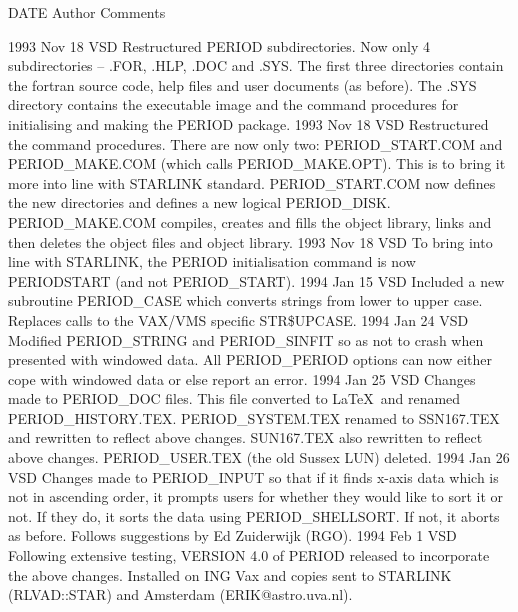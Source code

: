 \documentclass[twoside,11pt,noabs,nolof]{starlink}
\begin{document}
\newpage

\begin{small}
\begin{terminalv}
   DATE       Author            Comments


1993 Nov 18    VSD       Restructured PERIOD subdirectories. Now only 4
                         subdirectories -- .FOR, .HLP, .DOC and .SYS. The
                         first three directories contain the fortran source
                         code, help files and user documents (as before). The
                         .SYS directory contains the executable image and the
                         command procedures for initialising and making the
                         PERIOD package.
1993 Nov 18    VSD       Restructured the command procedures. There are now
                         only two: PERIOD_START.COM and PERIOD_MAKE.COM
                         (which calls PERIOD_MAKE.OPT). This is to bring it
                         more into line with STARLINK standard.
                         PERIOD_START.COM now defines the new directories
                         and defines a new logical PERIOD_DISK.
                         PERIOD_MAKE.COM compiles, creates and fills the
                         object library, links and then deletes the object
                         files and object library.
1993 Nov 18    VSD       To bring into line with STARLINK, the PERIOD
                         initialisation command is now PERIODSTART (and not
                         PERIOD_START).
1994 Jan 15    VSD       Included a new subroutine PERIOD_CASE which converts
                         strings from lower to upper case. Replaces calls
                         to the VAX/VMS specific STR\$UPCASE.
1994 Jan 24    VSD       Modified PERIOD_STRING and PERIOD_SINFIT so as not
                         to crash when presented with windowed data. All
                         PERIOD_PERIOD options can now either cope with
                         windowed data or else report an error.
1994 Jan 25    VSD       Changes made to PERIOD_DOC files. This file
                         converted to \LaTeX\ and renamed PERIOD_HISTORY.TEX.
                         PERIOD_SYSTEM.TEX renamed to SSN167.TEX and
                         rewritten to reflect above changes. SUN167.TEX also
                         rewritten to reflect above changes. PERIOD_USER.TEX
                         (the old Sussex LUN) deleted.
1994 Jan 26    VSD       Changes made to PERIOD_INPUT so that if it finds
                         x-axis data which is not in ascending order, it
                         prompts users for whether they would like to sort
                         it or not. If they do, it sorts the data using
                         PERIOD_SHELLSORT. If not, it aborts as before.
                         Follows suggestions by Ed Zuiderwijk (RGO).
1994 Feb 1     VSD       Following extensive testing, VERSION 4.0 of PERIOD
                         released to incorporate the above changes.
                         Installed on ING Vax and copies sent to STARLINK
                         (RLVAD::STAR) and Amsterdam (ERIK@astro.uva.nl).


\end{terminalv}
\end{small}
\end{document}
